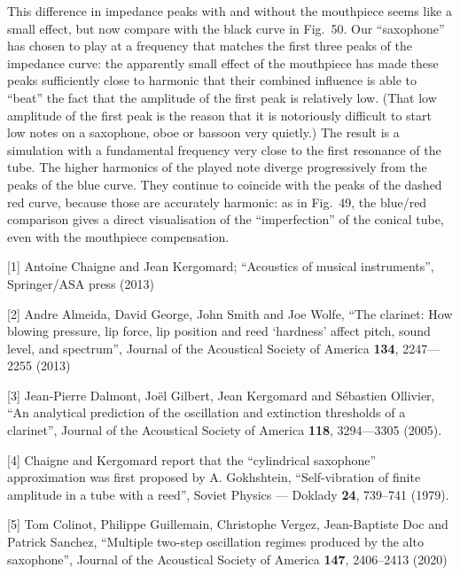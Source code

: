   This difference in impedance peaks with and without the mouthpiece seems like 
  a small effect, but now compare with the black curve in Fig.\ 50. Our 
  “saxophone” has chosen to play at a frequency that matches the first three 
  peaks of the impedance curve: the apparently small effect of the mouthpiece 
  has made these peaks sufficiently close to harmonic that their combined 
  influence is able to ``beat'' the fact that the amplitude of the first peak 
  is relatively low. (That low amplitude of the first peak is the reason that 
  it is notoriously difficult to start low notes on a saxophone, oboe or 
  bassoon very quietly.) The result is a simulation with a fundamental 
  frequency very close to the first resonance of the tube. The higher harmonics 
  of the played note diverge progressively from the peaks of the blue curve. 
  They continue to coincide with the peaks of the dashed red curve, because 
  those are accurately harmonic: as in Fig.\ 49, the blue/red comparison gives 
  a direct visualisation of the “imperfection” of the conical tube, even with 
  the mouthpiece compensation. 



  \sectionreferences{}[1] Antoine Chaigne and Jean Kergomard; “Acoustics of 
  musical instruments”, Springer/ASA press (2013) 

  [2] Andre Almeida, David George, John Smith and Joe Wolfe, “The clarinet: How 
  blowing pressure, lip force, lip position and reed ‘hardness’ affect pitch, 
  sound level, and spectrum”, Journal of the Acoustical Society of America 
  \textbf{134}, 2247—2255 (2013) 

  [3] Jean-Pierre Dalmont, Joël Gilbert, Jean Kergomard and Sébastien Ollivier, 
  “An analytical prediction of the oscillation and extinction thresholds of a 
  clarinet”, Journal of the Acoustical Society of America \textbf{118}, 
  3294—3305 (2005). 

  [4] Chaigne and Kergomard report that the ``cylindrical saxophone'' 
  approximation was first proposed by A. Gokhshtein, ``Self-vibration of finite 
  amplitude in a tube with a reed'', Soviet Physics --- Doklady \textbf{24}, 
  739--741 (1979). 

  [5] Tom Colinot, Philippe Guillemain, Christophe Vergez, Jean-Baptiste Doc 
  and Patrick Sanchez, “Multiple two-step oscillation regimes produced by the 
  alto saxophone”, Journal of the Acoustical Society of America \textbf{147}, 
  2406–2413 (2020) 